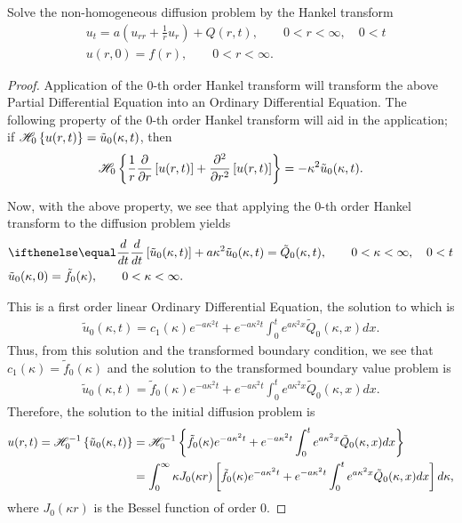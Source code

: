 \begin{problem}{1}
  Solve the non-homogeneous diffusion problem by the Hankel transform
  \begin{align*}
    &u_t = a\left(u_{rr} + \frac{1}{r}u_r\right) + Q(r, t), \qquad 0 < r < \infty, \quad 0 < t \\
    &u(r, 0) = f(r), \qquad 0 < r < \infty.
  \end{align*}
\end{problem}

\begin{proof}
  Application of the 0-th order Hankel transform will transform the above
  Partial Differential Equation into an Ordinary Differential Equation. The following property
  of the 0-th order Hankel transform will aid in the application;
  if $\mathscr{H}_{ {0} }\left\{ {u(r, t)} \right\} = \tilde{u}_0(\kappa, t)$,
  then
  \begin{align}
    \label{hankel}
    \mathscr{H}_{ {0} }\left\{ {\frac{1}{r}\frac{\partial}{\partial r}\left[u(r, t)\right] + \frac{\partial^2}{\partial r^2}\left[u(r, t)\right]} \right\} = -\kappa^2 \tilde{u}_0(\kappa, t).
  \end{align}

  Now, with the above property, we see that applying the 0-th order Hankel transform
  to the diffusion problem yields
  \begin{align*}
    &\der{t}{}\left[\tilde{u}_0(\kappa, t)\right] + a\kappa^2 \tilde{u}_0(\kappa, t) = \tilde{Q}_0(\kappa, t) , \qquad 0 < \kappa < \infty, \quad 0 < t \\
    &\tilde{u}_0(\kappa, 0) = \tilde{f}_0(\kappa), \qquad 0 < \kappa < \infty.
  \end{align*}

  This is a first order linear Ordinary Differential Equation, the solution to which is
  \begin{align*}
    \tilde{u}_0(\kappa, t) = c_1(\kappa)e^{-a\kappa^2 t} + e^{-a\kappa^2 t}\int_0^t e^{a\kappa^2 x}\tilde{Q}_0(\kappa, x) dx.
  \end{align*}
  Thus, from this solution and the transformed boundary condition, we see that $c_1(\kappa) = \tilde{f}_0(\kappa)$ and the solution to the transformed
  boundary value problem is
  \begin{align*}
    \tilde{u}_0(\kappa, t) = \tilde{f}_0(\kappa)e^{-a\kappa^2 t} + e^{-a\kappa^2 t}\int_0^t e^{a\kappa^2 x}\tilde{Q}_0(\kappa, x) dx.
  \end{align*}
  Therefore, the solution to the initial diffusion problem is
  \begin{align*}
    u(r, t) = \mathscr{H}^{-1}_{ {0} }\left\{ {\tilde{u}_0(\kappa, t)} \right\}
    &= \mathscr{H}^{-1}_{ {0} }\left\{ {\tilde{f}_0(\kappa)e^{-a\kappa^2 t} + e^{-a\kappa^2 t}\int_0^t e^{a\kappa^2 x}\tilde{Q}_0(\kappa, x) dx} \right\} \\
    &= \int_0^\infty \kappa J_0(\kappa r)\left[\tilde{f}_0(\kappa)e^{-a\kappa^2 t} + e^{-a\kappa^2 t}\int_0^t e^{a\kappa^2 x}\tilde{Q}_0(\kappa, x) dx\right] d\kappa,
  \end{align*}
  where $J_0(\kappa r)$ is the Bessel function of order 0.

\end{proof}
\newpage
